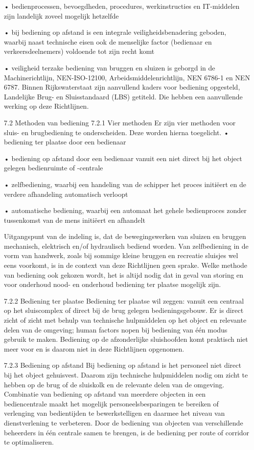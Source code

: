 • bedienprocessen, bevoegdheden, procedures, werkinstructies en IT-middelen zijn landelijk
zoveel mogelijk hetzelfde

• bij bediening op afstand is een integrale veiligheidsbenadering geboden, waarbij naast
technische eisen ook de menselijke factor (bedienaar en verkeersdeelnemers) voldoende tot
zijn recht komt

• veiligheid terzake bediening van bruggen en sluizen is geborgd in de Machinerichtlijn,
NEN-ISO-12100, Arbeidsmiddelenrichtlijn, NEN 6786-1 en NEN 6787.
Binnen Rijkswaterstaat zijn aanvullend kaders voor bediening opgesteld, Landelijke Brug- en
Sluisstandaard (LBS) getiteld. Die hebben een aanvullende werking op deze Richtlijnen.

7.2 Methoden van bediening
7.2.1 Vier methoden
Er zijn vier methoden voor sluis- en brugbediening te onderscheiden. Deze worden hierna
toegelicht.
• bediening ter plaatse door een bedienaar

• bediening op afstand door een bedienaar vanuit een niet direct bij het object gelegen
bedienruimte of -centrale

• zelfbediening, waarbij een handeling van de schipper het proces initiëert en de verdere
afhandeling automatisch verloopt

• automatische bediening, waarbij een automaat het gehele bedienproces zonder tussenkomst van de mens initiëert en afhandelt

Uitgangspunt van de indeling is, dat de bewegingswerken van sluizen en bruggen mechanisch,
elektrisch en/of hydraulisch bediend worden. Van zelfbediening in de vorm van handwerk,
zoals bij sommige kleine bruggen en recreatie sluisjes wel eens voorkomt, is in de context van
deze Richtlijnen geen sprake. Welke methode van bediening ook gekozen wordt, het is altijd
nodig dat in geval van storing en voor onderhoud nood- en onderhoud bediening ter plaatse
mogelijk zijn.

7.2.2 Bediening ter plaatse
Bediening ter plaatse wil zeggen: vanuit een centraal op het sluiscomplex of direct bij de brug
gelegen bedieningsgebouw. Er is direct zicht of zicht met behulp van technische hulpmiddelen
op het object en relevante delen van de omgeving; human factors nopen bij bediening van één
modus gebruik te maken. Bediening op de afzonderlijke sluishoofden komt praktisch niet meer
voor en is daarom niet in deze Richtlijnen opgenomen.

7.2.3 Bediening op afstand
Bij bediening op afstand is het personeel niet direct bij het object gehuisvest. Daarom zijn
technische hulpmiddelen nodig om zicht te hebben op de brug of de sluiskolk en de relevante
delen van de omgeving.
Combinatie van bediening op afstand van meerdere objecten in een bediencentrale maakt het
mogelijk personeelsbesparingen te bereiken of verlenging van bedientijden te bewerkstelligen
en daarmee het niveau van dienstverlening te verbeteren. Door de bediening van objecten van
verschillende beheerders in één centrale samen te brengen, is de bediening per route of
corridor te optimaliseren.

